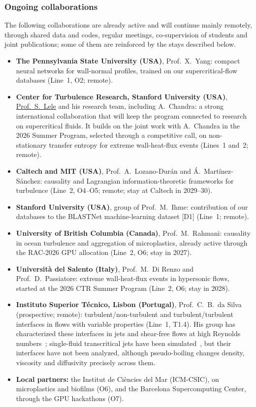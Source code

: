 \documentclass[11pt]{article}
\begin{document}
\subsubsection*{Ongoing collaborations}
The following collaborations are already active and will continue mainly remotely, through shared
data and codes, regular meetings, co-supervision of students and joint publications; some of them
are reinforced by the stays described below.
\begin{itemize}
  \item \textbf{The Pennsylvania State University (USA)}, Prof.\ X.\ Yang: compact neural networks
  for wall-normal profiles, trained on our supercritical-flow databases (Line~1, O2; remote).
  \item \textbf{Center for Turbulence Research, Stanford University (USA)},
  \href{https://me.stanford.edu/people/sanjiva-lele}{Prof.\ S.\ Lele} and his research team, including
  A.\ Chandra: a strong international collaboration that will keep the program connected to research
  on supercritical fluids. It builds on the joint work with A.\ Chandra in the 2026 Summer Program,
  selected through a competitive call, on non-stationary transfer entropy for extreme wall-heat-flux
  events (Lines~1 and~2; remote).
  \item \textbf{Caltech and MIT (USA)}, Prof.\ A.\ Lozano-Dur\'an and \'A.\ Mart\'inez-S\'anchez:
  causality and Lagrangian information-theoretic frameworks for turbulence (Line~2, O4--O5; remote; stay at Caltech in 2029--30).
  \item \textbf{Stanford University (USA)}, group of Prof.\ M.\ Ihme: contribution of our databases
  to the BLASTNet machine-learning dataset [D1] (Line~1; remote).
  \item \textbf{University of British Columbia (Canada)}, Prof.\ M.\ Rahmani: causality in ocean
  turbulence and aggregation of microplastics, already active through the RAC-2026 GPU allocation
  (Line~2, O6; stay in 2027).
  \item \textbf{Universit\`a del Salento (Italy)}, Prof.\ M.\ Di Renzo and Prof.\ D.\ Passiatore:
  extreme wall-heat-flux events in hypersonic flows, started at the 2026 CTR Summer Program
  (Line~2, O6; stay in 2028).
  \item \textbf{Instituto Superior T\'ecnico, Lisbon (Portugal)}, Prof.\ C.\ B.\ da Silva
  (prospective; remote): turbulent/non-turbulent and turbulent/turbulent interfaces in flows with
  variable properties (Line~1, T1.4). His group has characterized these interfaces in jets and
  shear-free flows at high Reynolds numbers~\cite{Silva2018,Alves2025}; single-fluid transcritical
  jets have been simulated~\cite{Lapenna2019,Ream2025}, but their interfaces have not been analyzed,
  although pseudo-boiling changes density, viscosity and diffusivity precisely across them.
  \item \textbf{Local partners:} the Institut de Ci\`encies del Mar (ICM-CSIC), on microplastics and
  biofilms (O6), and the Barcelona Supercomputing Center, through the GPU hackathons (O7).
\end{itemize}
\end{document}
